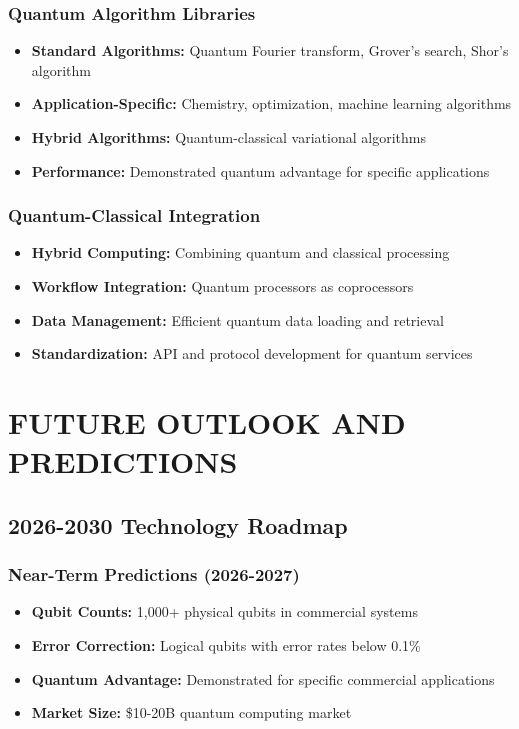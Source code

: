 \documentclass[12pt,a4paper]{article}
\begin{document}
\subsubsection{Quantum Algorithm Libraries}
\begin{itemize}
    \item \textbf{Standard Algorithms:} Quantum Fourier transform, Grover's search, Shor's algorithm
    \item \textbf{Application-Specific:} Chemistry, optimization, machine learning algorithms
    \item \textbf{Hybrid Algorithms:} Quantum-classical variational algorithms
    \item \textbf{Performance:} Demonstrated quantum advantage for specific applications
\end{itemize}

\subsubsection{Quantum-Classical Integration}
\begin{itemize}
    \item \textbf{Hybrid Computing:} Combining quantum and classical processing
    \item \textbf{Workflow Integration:} Quantum processors as coprocessors
    \item \textbf{Data Management:} Efficient quantum data loading and retrieval
    \item \textbf{Standardization:} API and protocol development for quantum services
\end{itemize}

\section{FUTURE OUTLOOK AND PREDICTIONS}

\subsection{2026-2030 Technology Roadmap}

\subsubsection{Near-Term Predictions (2026-2027)}
\begin{itemize}
    \item \textbf{Qubit Counts:} 1,000+ physical qubits in commercial systems
    \item \textbf{Error Correction:} Logical qubits with error rates below 0.1\%
    \item \textbf{Quantum Advantage:} Demonstrated for specific commercial applications
    \item \textbf{Market Size:} \$10-20B quantum computing market
\end{itemize}
\end{document}

